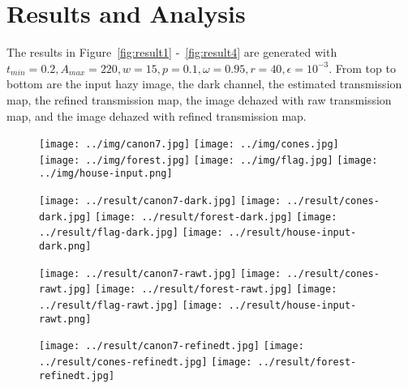 \documentclass{article}
\begin{document}
\section{Results and Analysis}

The results in Figure~\ref{fig:result1} -~\ref{fig:result4} are generated with $t_{min} = 0.2, A_{max} = 220, w = 15, p=0.1, \omega=0.95,r=40, \epsilon=10^{-3}$. From top to bottom are the input hazy image, the dark channel, the estimated transmission map, the refined transmission map, the image dehazed with raw transmission map, and the image dehazed with refined transmission map.

\begin{figure}[H]
    \centering
    \begin{minipage}[b]{\linewidth}
        \centering
        \texttt{[image: ../img/canon7.jpg]}
        \texttt{[image: ../img/cones.jpg]}
        \texttt{[image: ../img/forest.jpg]}
        \texttt{[image: ../img/flag.jpg]}
        \texttt{[image: ../img/house-input.png]}
    \end{minipage}
    \begin{minipage}[b]{\linewidth}
        \centering
        \texttt{[image: ../result/canon7-dark.jpg]}
        \texttt{[image: ../result/cones-dark.jpg]}
        \texttt{[image: ../result/forest-dark.jpg]}
        \texttt{[image: ../result/flag-dark.jpg]}
        \texttt{[image: ../result/house-input-dark.png]}
    \end{minipage}
    \begin{minipage}[b]{\linewidth}
        \centering
        \texttt{[image: ../result/canon7-rawt.jpg]}
        \texttt{[image: ../result/cones-rawt.jpg]}
        \texttt{[image: ../result/forest-rawt.jpg]}
        \texttt{[image: ../result/flag-rawt.jpg]}
        \texttt{[image: ../result/house-input-rawt.png]}
    \end{minipage}
    \begin{minipage}[b]{\linewidth}
        \centering
        \texttt{[image: ../result/canon7-refinedt.jpg]}
        \texttt{[image: ../result/cones-refinedt.jpg]}
        \texttt{[image: ../result/forest-refinedt.jpg]}

\end{minipage}
\end{figure}
\end{document}
